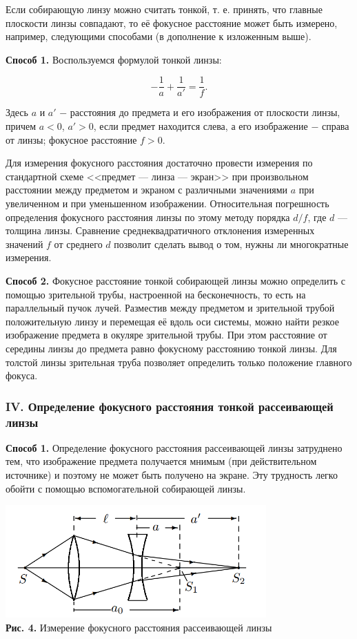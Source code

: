 \documentclass[a4paper,12pt]{article} %
\begin{document}
\hfill \break Если собирающую линзу можно считать тонкой, т. е. принять, что главные плоскости линзы совпадают, то её фокусное расстояние может быть измерено, например, следующими способами (в дополнение к изложенным выше).

\hfill \break \textbf{Способ 1.} Воспользуемся формулой тонкой линзы:

\begin{equation}\label{thin}
    -\frac{1}{a} + \frac{1}{a'} = \frac{1}{f}.
\end{equation}

\hfill \break Здесь $a$ и $a'$ $-$ расстояния до предмета и его изображения от плоскости линзы, причем $a < 0$, $a' > 0$, если предмет находится слева, а его изображение $-$ справа от линзы; фокусное расстояние $f > 0$.

\hfill \break Для измерения фокусного расстояния достаточно провести измерения по стандартной схеме <<предмет — линза — экран>> при произвольном расстоянии между предметом и экраном с различными значениями $a$ при увеличенном и при уменьшенном изображении. Относительная погрешность определения фокусного расстояния линзы по этому методу порядка $d/f$, где $d$ — толщина линзы. Сравнение среднеквадратичного отклонения измеренных значений $f$ от среднего $d$ позволит сделать вывод о том, нужны ли многократные измерения.

\hfill \break \textbf{Способ 2.} Фокусное расстояние тонкой собирающей линзы можно определить с помощью зрительной трубы, настроенной на бесконечность, то есть на параллельный пучок лучей. Разместив между предметом и зрительной трубой положительную линзу и перемещая её вдоль оси системы, можно найти резкое изображение предмета в окуляре зрительной трубы. При этом расстояние от середины линзы до предмета равно фокусному расстоянию тонкой линзы. Для толстой линзы зрительная труба позволяет определить только положение главного фокуса. 

\subsubsection*{IV. Определение фокусного расстояния тонкой рассеивающей линзы}
\hfill \break \textbf{Способ 1.} Определение фокусного расстояния рассеивающей линзы затруднено тем, что изображение предмета получается мнимым (при действительном источнике) и поэтому не может быть получено на экране. Эту трудность легко обойти с помощью вспомогательной собирающей линзы.

\begin{center}
\includegraphics[width=0.75\textwidth]{4.1.1_4.png}\\
\textbf{Рис. 4.} Измерение фокусного расстояния рассеивающей линзы \\
\end{center}
\end{document}
